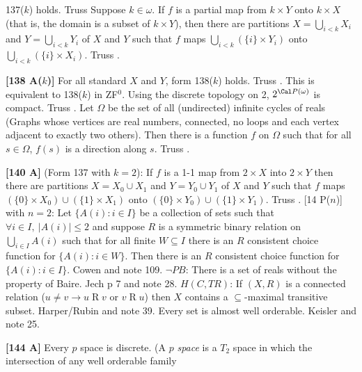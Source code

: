 137($k$) holds.  \ac{Truss} \cite{1984}
\medskip
{} Suppose $k\in\omega$.  If $f$ is a
partial map from $k\times Y$  onto $k\times X$ (that is, the domain
is a subset of $k\times Y$), then there are partitions $X =
\bigcup^{}_{i<k} X_{i}$  and $Y = \bigcup^{}_{i<k} Y_{i}$ of $X$ and $Y$
such that $f$ maps $\bigcup^{}_{i<k} (\{i\} \times Y_{i})$ onto
$\bigcup^{}_{i<k} (\{i\} \times X_{i})$.  \ac{Truss} \cite{1984}.
\smallskip
\item{}{\bf [138 A($k$)]} For all standard $X$ and $Y$, form 138($k$)
holds. \ac{Truss} \cite{1984}. This is equivalent to 138($k$) in ZF$^0$.
\medskip
{} Using the discrete topology on 2,
$2^{\Cal P(\omega)}$ is compact. \ac{Truss} \cite{1984}.
\medskip
{} Let $\Omega$ be the set of all (undirected)
infinite cycles of reals (Graphs whose vertices are real numbers,
connected, no loops and each vertex adjacent to  exactly two others). Then
there is a function $f$ on $\Omega $ such that for all $s\in\Omega$,
$f(s)$ is a direction along $s$.  \ac{Truss} \cite{1984}.
\smallskip
\item{}{\bf [140 A]}  (Form 137 with $k = 2$):  If $f$ is a 1-1
map from $2\times X$ into $2\times Y$ then there are partitions $X =
X_0 \cup X_1$ and $Y = Y_0 \cup Y_1$ of $X$ and $Y$
such that $f$ maps $(\{0\}\times X_0)\cup (\{1\}\times X_1)$ onto
$(\{0\}\times Y_0)\cup (\{1\}\times Y_1)$.  \ac{Truss} \cite{1984}.
\medskip
{} [14 P($n$)] with $n = 2$:  Let $\{A(i): i\in I\}$
be a collection of sets such that $\forall i\in I,\ |A(i)|\le 2$ and
suppose $R$ is a symmetric binary relation on $\bigcup^{}_{i\in I} A(i)$
such that for all finite $W\subseteq I$ there is an $R$ consistent choice
function for $\{A(i): i \in W\}$. Then there is an $R$ consistent choice
function for $\{A(i): i\in I\}$. \ac{Cowen} \cite{1977b} and note 109.
\medskip
{} $\neg  PB$:  There is a set of reals without the
property of Baire.  \ac{Jech} \cite{1973b} p 7 and note 28.
\medskip
{} $H(C,TR)$: If $(X,R)$ is a connected relation
($u\neq v\rightarrow u\mathrel R v$ or $v\mathrel R u$) then $X$ contains
a $\subseteq$-maximal transitive subset.  \ac{Harper/Rubin} \cite{1976}
and note 39.
\medskip
{} Every set is almost well orderable. \ac{Keisler}
\cite{1970} and note 25.
\smallskip
\item{}{\bf [144 A]}  Every $p$ space is discrete. (A $p$ {\it space} is a
$T_2$ space in which the intersection of any well orderable family
